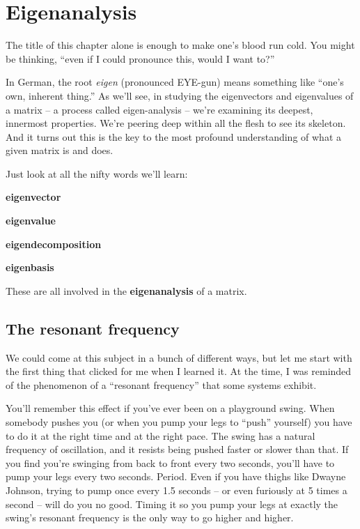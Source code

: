 

\chapter{Eigenanalysis}
\label{ch:eigen}

The title of this chapter alone is enough to make one's blood run cold. You
might be thinking, ``even if I could pronounce this, would I want to?''

In German, the root \textit{eigen} (pronounced EYE-gun) means something like
``one's own, inherent thing.'' As we'll see, in studying the eigenvectors and
eigenvalues of a matrix -- a process called eigen-analysis -- we're examining
its deepest, innermost properties. We're peering deep within all the flesh to
see its skeleton. And it turns out this is the key to the most profound
understanding of what a given matrix is and does.

Just look at all the nifty words we'll learn:

\begin{compactitem}
\item \textbf{eigenvector}
\item \textbf{eigenvalue}
\item \textbf{eigendecomposition}
\item \textbf{eigenbasis}
\end{compactitem}

These are all involved in the \textbf{eigenanalysis} of a matrix.

\section{The resonant frequency}


We could come at this subject in a bunch of different ways, but let me start
with the first thing that clicked for me when I learned it. At the time, I was
reminded of the phenomenon of a ``resonant frequency'' that some systems
exhibit.


You'll remember this effect if you've ever been on a playground swing. When
somebody pushes you (or when you pump your legs to ``push'' yourself) you have
to do it at the right time and at the right pace. The swing has a natural
frequency of oscillation, and it resists being pushed faster or slower than
that. If you find you're swinging from back to front every two seconds, you'll
have to pump your legs every two seconds. Period. Even if you have thighs like
Dwayne Johnson, trying to pump once every 1.5 seconds --  or even furiously at
5 times a second -- will do you no good. Timing it so you pump your legs at
exactly the swing's resonant frequency is the only way to go higher and higher.

